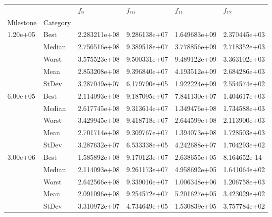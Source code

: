 \begin{tabular}{llllll}
\toprule
         &      &      $f_{9}$ &     $f_{10}$ &     $f_{11}$ &     $f_{12}$ \\
Milestone & Category &              &              &              &              \\
\midrule
\multirow{5}{*}{1.20e+05} & Best & 2.283211e+08 & 9.286138e+07 & 1.649683e+09 & 2.370445e+03 \\
         & Median & 2.756516e+08 & 9.389518e+07 & 3.778856e+09 & 2.718352e+03 \\
         & Worst & 3.575523e+08 & 9.500331e+07 & 9.489122e+09 & 3.363102e+03 \\
         & Mean & 2.853208e+08 & 9.396840e+07 & 4.193512e+09 & 2.684286e+03 \\
         & StDev & 3.287049e+07 & 6.179790e+05 & 1.922224e+09 & 2.554574e+02 \\
\cline{1-6}
\multirow{5}{*}{6.00e+05} & Best & 2.114093e+08 & 9.187095e+07 & 7.841130e+07 & 1.404617e+03 \\
         & Median & 2.617745e+08 & 9.313614e+07 & 1.349476e+08 & 1.734588e+03 \\
         & Worst & 3.429945e+08 & 9.418718e+07 & 2.644599e+08 & 2.113900e+03 \\
         & Mean & 2.701714e+08 & 9.309767e+07 & 1.394073e+08 & 1.728503e+03 \\
         & StDev & 3.287632e+07 & 6.533338e+05 & 4.242688e+07 & 1.704293e+02 \\
\cline{1-6}
\multirow{5}{*}{3.00e+06} & Best & 1.585892e+08 & 9.170123e+07 & 2.638655e+05 & 8.164652e-14 \\
         & Median & 2.114093e+08 & 9.261173e+07 & 4.958692e+05 & 1.641064e+02 \\
         & Worst & 2.642566e+08 & 9.339016e+07 & 1.006348e+06 & 1.206758e+03 \\
         & Mean & 2.091096e+08 & 9.254572e+07 & 5.201627e+05 & 3.423029e+02 \\
         & StDev & 3.310972e+07 & 4.734649e+05 & 1.530839e+05 & 3.757784e+02 \\
\bottomrule
\end{tabular}
